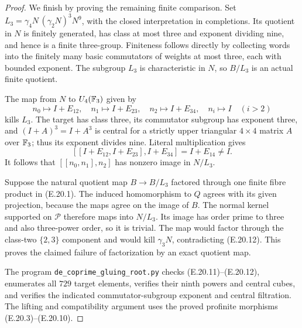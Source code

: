 \begin{proof}
We finish by proving the remaining finite comparison.
Set $L_3=\gamma_4N\,(\gamma_2N)^3N^9$, with the
closed interpretation in completions. Its quotient
in $N$ is finitely generated, has class at most
three and exponent dividing nine, and hence is a
finite three-group. Finiteness follows directly by
collecting words into the finitely many basic
commutators of weights at most three, each with
bounded exponent. The subgroup $L_3$ is characteristic
in $N$, so $B/L_3$ is an actual finite quotient.

The map from $N$ to $U_4(\mathbb F_3)$ given by
\[
 n_0\longmapsto I+E_{12},\quad
 n_1\longmapsto I+E_{23},\quad
 n_2\longmapsto I+E_{34},\quad
 n_i\longmapsto I\quad(i>2)
 \tag{E.20.11}
\]
kills $L_3$. The target has class three, its
commutator subgroup has exponent three, and
$(I+A)^3=I+A^3$ is central for a strictly upper
triangular $4\times4$ matrix $A$ over $\mathbb F_3$;
thus its exponent divides nine. Literal
multiplication gives
\[
 [[I+E_{12},I+E_{23}],I+E_{34}]=I+E_{14}\ne I.
 \tag{E.20.12}
\]
It follows that $[[n_0,n_1],n_2]$ has nonzero image
in $N/L_3$.

Suppose the natural quotient map $B\to B/L_3$
factored through one finite fibre product in
(E.20.1). The induced homomorphism to $Q$ agrees
with its given projection, because the maps agree
on the image of $B$. The normal kernel supported
on $\mathscr P$ therefore maps into $N/L_3$.
Its image has order prime to three and also
three-power order, so it is trivial. The map would
factor through the class-two $\{2,3\}$ component
and would kill $\gamma_3N$, contradicting
(E.20.12). This proves the claimed failure of
factorization by an exact quotient map.

The program \texttt{de\_coprime\_gluing\_root.py}
checks (E.20.11)--(E.20.12), enumerates all $729$
target elements, verifies their ninth powers and
central cubes, and verifies the indicated
commutator-subgroup exponent and central filtration.
The lifting and compatibility argument uses the
proved profinite morphisms (E.20.3)--(E.20.10).
\end{proof}
